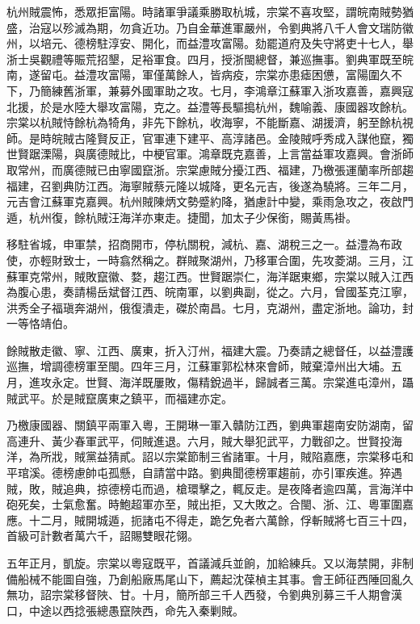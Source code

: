 \begin{pinyinscope}
杭州賊震怖，悉眾拒富陽。時諸軍爭議乘勝取杭城，宗棠不喜攻堅，謂皖南賊勢猶盛，治寇以殄滅為期，勿貪近功。乃自金華進軍嚴州，令劉典將八千人會文瑞防徽州，以培元、德榜駐淳安、開化，而益澧攻富陽。劾罷道府及失守將吏十七人，舉浙士吳觀禮等賑荒招墾，足裕軍食。四月，授浙閩總督，兼巡撫事。劉典軍既至皖南，遂留屯。益澧攻富陽，軍僅萬餘人，皆病疫，宗棠亦患瘧困憊，富陽圍久不下，乃簡練舊浙軍，兼募外國軍助之攻。七月，李鴻章江蘇軍入浙攻嘉善，嘉興寇北援，於是水陸大舉攻富陽，克之。益澧等長驅搗杭州，魏喻義、康國器攻餘杭。宗棠以杭賊恃餘杭為犄角，非先下餘杭，收海寧，不能斷嘉、湖援濟，躬至餘杭視師。是時皖賊古隆賢反正，官軍連下建平、高淳諸邑。金陵賊呼秀成入謀他竄，獨世賢踞溧陽，與廣德賊比，中梗官軍。鴻章既克嘉善，上言當益軍攻嘉興。會浙師取常州，而廣德賊已由寧國竄浙。宗棠慮賊分擾江西、福建，乃檄張運蘭率所部趨福建，召劉典防江西。海寧賊蔡元隆以城降，更名元吉，後遂為驍將。三年二月，元吉會江蘇軍克嘉興。杭州賊陳炳文勢蹙約降，猶慮計中變，乘雨急攻之，夜啟門遁，杭州復，餘杭賊汪海洋亦東走。捷聞，加太子少保銜，賜黃馬褂。

移駐省城，申軍禁，招商開市，停杭關稅，減杭、嘉、湖稅三之一。益澧為布政使，亦輕財致士，一時翕然稱之。群賊聚湖州，乃移軍合圍，先攻菱湖。三月，江蘇軍克常州，賊敗竄徽、婺，趨江西。世賢踞崇仁，海洋踞東鄉，宗棠以賊入江西為腹心患，奏請楊岳斌督江西、皖南軍，以劉典副，從之。六月，曾國荃克江寧，洪秀全子福瑱奔湖州，俄復潰走，磔於南昌。七月，克湖州，盡定浙地。論功，封一等恪靖伯。

餘賊散走徽、寧、江西、廣東，折入汀州，福建大震。乃奏請之總督任，以益澧護巡撫，增調德榜軍至閩。四年三月，江蘇軍郭松林來會師，賊棄漳州出大埔。五月，進攻永定。世賢、海洋既屢敗，傷精銳過半，歸誠者三萬。宗棠進屯漳州，躡賊武平。於是賊竄廣東之鎮平，而福建亦定。

乃檄康國器、關鎮平兩軍入粵，王開琳一軍入贛防江西，劉典軍趨南安防湖南，留高連升、黃少春軍武平，伺賊進退。六月，賊大舉犯武平，力戰卻之。世賢投海洋，為所戕，賊黨益猜貳。詔以宗棠節制三省諸軍。十月，賊陷嘉應，宗棠移屯和平琯溪。德榜慮帥屯孤懸，自請當中路。劉典聞德榜軍趨前，亦引軍疾進。猝遇賊，敗，賊追典，掠德榜屯而過，槍環擊之，輒反走。是夜降者逾四萬，言海洋中砲死矣，士氣愈奮。時鮑超軍亦至，賊出拒，又大敗之。合閩、浙、江、粵軍圍嘉應。十二月，賊開城遁，扼諸屯不得走，跪乞免者六萬餘，俘斬賊將七百三十四，首級可計數者萬六千，詔賜雙眼花翎。

五年正月，凱旋。宗棠以粵寇既平，首議減兵並餉，加給練兵。又以海禁開，非制備船械不能圖自強，乃創船廠馬尾山下，薦起沈葆楨主其事。會王師征西陲回亂久無功，詔宗棠移督陜、甘。十月，簡所部三千人西發，令劉典別募三千人期會漢口，中途以西捻張總愚竄陜西，命先入秦剿賊。


\end{pinyinscope}
